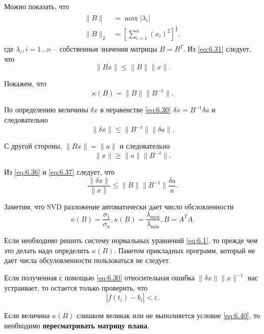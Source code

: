 Можно показать, что
\begin{align}
	\begin{split}
		\|B\| &= \max |\lambda_i| \\
		\|B\|_2 &= [\sum^n_{i=1}{(x_{i})^2}]^{\frac{1}{2}},
	\end{split}
\end{align}
где $\lambda_i, i=1 \dots n$ -- собственные значения матрицы $B = B^T$. Из \ref{eq:6.31} следует, что 
\begin{equation}
	 \|Bx\| \leq \|B\|\|x\|.
\end{equation}

Покажем, что 
\begin{equation}
	\kappa(B) = \|B\|\|B^{-1}\|.
\end{equation}

По определению величины $\delta x$ в неравенстве \ref{eq:6.30} $\delta x = B^{-1} \delta a$ и следовательно
\begin{equation} \label{eq:6.36}
	\|\delta x\| \leq \|B^{-1}\|\|\delta a\|.
\end{equation} 

С другой стороны, $\|Bx\| = \|a\|$ и следовательно
\begin{equation} \label{eq:6.37}
	\|x\| \geq \|a\|\|B^{-1}\|.
\end{equation}

Из \ref{eq:6.36} и \ref{eq:6.37} следует, что
\begin{equation}
	\frac{\|\delta x\|}{\|x\|} \leq \|B\|\|B^{-1}\| \frac{\delta a}{a}.
\end{equation}

Заметим, что SVD разложение автоматически дает число обсловленности
\begin{equation}
	\kappa(B) = \frac{\sigma_1}{\sigma_n}, \kappa(B) = \frac{\lambda_\max}{\lambda_\min}, B=A^TA.
\end{equation}

Если необходимо решить систему нормальных уравнений \ref{eq:6.1}, то прежде чем это делать надо определить $\kappa(B)$. Пакетом прикладных программ, который не дает числа обсуловленности пользоваться не следует.

Если полученная с помощью \ref{eq:6.30} относительная ошибка $\|\delta x\|\|x\|^{-1}$ нас устраивает, то остается только проверить, что 
\begin{equation} \label{eq:6.40}
	|\overline{f}(t_i) - b_i| < \varepsilon.
\end{equation}

Если величина $\kappa(B)$ слишком великак или не выполняется условие \ref{eq:6.40}, то необходимо \textbf{пересматривать матрицу плана}.